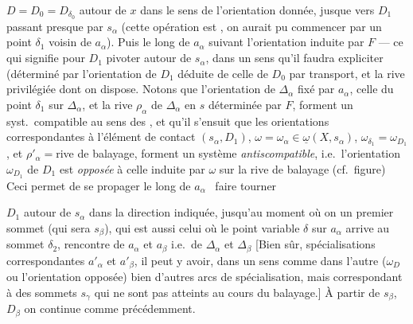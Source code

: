 \documentclass[11pt,a4paper]{article}
\begin{document}
$D = D_0 = D_{\delta_0}$ autour de $x$ dans le sens de l'orientation donnée, jusque vers $D_1$ passant presque par $s_\alpha$ (cette opération est , on aurait pu commencer par un point $\delta_1$ voisin de $a_\alpha$). Puis  le long de $a_\alpha$ suivant l'orientation induite par $F$ --- ce qui signifie pour $D_1$ pivoter autour de $s_\alpha$, dans un sens qu'il faudra expliciter  (déterminé par l'orientation de $D_1$ déduite de celle de $D_0$ par transport, et la rive privilégiée dont on dispose. Notons que l'orientation \add{$\omega_\alpha$} de $\Delta_\alpha$ fixé par $a_\alpha$, celle \struck{\ill{}}  du point $\delta_1$ sur $\Delta_\alpha$, et la rive $\rho_\alpha$ de $\Delta_\alpha$ en $s$ déterminée par $F$, forment un syst.\ compatible au sens des , et qu'il s'ensuit que les orientations correspondantes à l'élément de contact $(s_\alpha, D_1)$, $\omega = \omega_\alpha \in \underline{\omega}(X, s_\alpha)$, $\omega_{\delta_1} = \omega_{D_1}$, et $\rho'_\alpha = {}$rive de balayage, forment un système \emph{antiscompatible}, i.e.\ l'orientation $\omega_{D_1}$ de $D_1$ est \emph{opposée} à celle induite par $\omega$ sur la rive de balayage (cf.\ figure) Ceci permet  de se propager le long de $a_\alpha$ \ faire tourner

$D_1$ autour de $s_\alpha$ dans la direction indiquée, jusqu'au moment où on  un premier sommet (qui sera $s_\beta$), qui est aussi celui où le point variable $\delta$ sur $a_\alpha$ arrive au sommet $\delta_2$, rencontre de \struck{\ill{}} $a_\alpha$ et $a_\beta$ i.e.\ de $\Delta_\alpha$ et $\Delta_\beta$ [Bien sûr,  \struck{\ill{} \ill{}}  spécialisations correspondantes $a'_\alpha$ et $a'_\beta$, il peut y avoir, dans un sens comme dans l'autre ($\omega_D$ ou l'orientation opposée) bien d'autres arcs de spécialisation, mais correspondant à des sommets $s_\gamma$ qui ne sont pas atteints au cours du balayage.] À partir de $s_\beta$, $D_\beta$ on continue comme précédemment.

\end{document}
